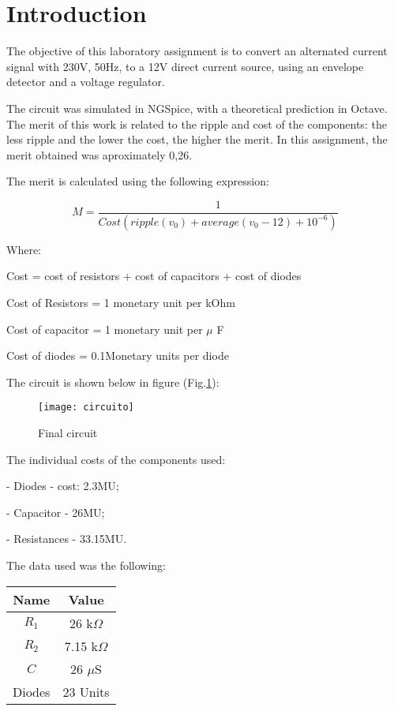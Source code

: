 \section{Introduction}
\label{sec:introduction}

The objective of this laboratory assignment is to convert an alternated current signal with 230V, 50Hz, to a 12V direct current source, using an envelope detector and a voltage regulator.\par
The circuit was simulated in NGSpice, with a theoretical prediction in Octave. The merit of this work is related to the ripple and cost of the components: the less ripple and the lower the cost, the higher the merit. In this assignment, the merit obtained was aproximately 0,26. 

The merit is calculated using the following expression:\par
\begin{equation}
    M = \frac{1}{Cost(ripple(v_0)+average(v_0-12)+10^{-6})}
\end{equation}\par
Where: \par
Cost = cost of resistors + cost of capacitors + cost of diodes \par
Cost of Resistors = 1 monetary unit per kOhm \par
Cost of capacitor = 1 monetary unit per $\mu$ F \par
Cost of diodes = 0.1Monetary units per diode \par
The circuit is shown below in figure (Fig.\ref{fig:circuito}): \par

\begin{figure}[H]
\centering
\texttt{[image: circuito]}
\caption{Final circuit}
\label{fig:circuito}
\end{figure}

The individual costs of the components used: \par
- Diodes - cost: 2.3MU; \par
- Capacitor - 26MU; \par
- Resistances - 33.15MU. \par

The data used was the following:

\begin{center}
  \begin{tabular}{ | c | c | }
    \hline    
    {\bf Name} & {\bf Value} \\ \hline
    $R_1$ & 26 k$\Omega$ \\ \hline 
    $R_2$ & 7.15 k$\Omega$ \\ \hline 
    $C$ & 26 $\mu$S \\ \hline
    Diodes & 23 Units \\ 
    \hline
  \end{tabular}
\end{center}
